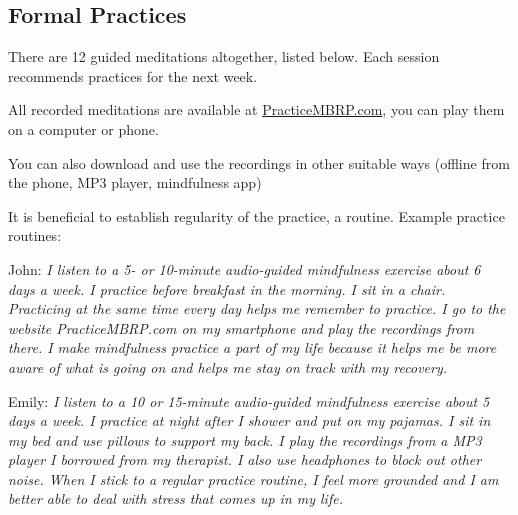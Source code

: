 \clearpage
\subsection{Formal Practices}
	There are 12 guided meditations altogether, listed below. Each session recommends practices for the next week.
	\begin{itemize*}
		\item All recorded meditations are available at \href{https://PracticeMBRP.com}{PracticeMBRP.com}, you can play them on a computer or phone.
		\item You can also download and use the recordings in other suitable ways (offline from the phone, MP3 player, mindfulness app)
	\end{itemize*}
	It is beneficial to establish regularity of the practice, a routine. Example practice routines:
	\begin{description*}
		\item[John:] \emph{I listen to a 5- or 10-minute audio-guided mindfulness exercise about 6 days a week. I practice before breakfast in the morning. I sit in a chair. Practicing at the same time every day helps me remember to practice. I go to the website PracticeMBRP.com on my smartphone and play the recordings from there. I make mindfulness practice a part of my life because it helps me be more aware of what is going on and helps me stay on track with my recovery.}
		\item[Emily:] \emph{I listen to a 10 or 15-minute audio-guided mindfulness exercise about 5 days a week. I practice at night after I shower and put on my pajamas. I sit in my bed and use pillows to support my back. I play the recordings from a MP3 player I borrowed from my therapist. I also use headphones to block out other noise. When I stick to a regular practice routine, I feel more grounded and I am better able to deal with stress that comes up in my life.}
	\end{description*}

	\clearpage
